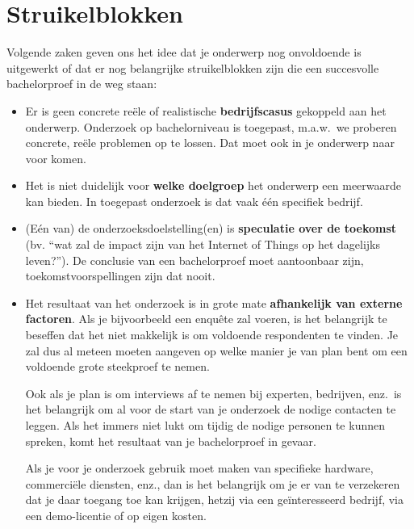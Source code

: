 \section{Struikelblokken}%
\label{sec:onderwerp-struikelblokken}

Volgende zaken geven ons het idee dat je onderwerp nog onvoldoende is uitgewerkt of dat er nog belangrijke struikelblokken zijn die een succesvolle bachelorproef in de weg staan:

\begin{itemize}
  \item Er is geen concrete reële of realistische \textbf{bedrijfscasus} gekoppeld aan het onderwerp. Onderzoek op bachelorniveau is toegepast, m.a.w.~we proberen concrete, reële problemen op te lossen. Dat moet ook in je onderwerp naar voor komen.

  \item Het is niet duidelijk voor \textbf{welke doelgroep} het onderwerp een meerwaarde kan bieden. In toegepast onderzoek is dat vaak één specifiek bedrijf.
  \item (Eén van) de onderzoeksdoelstelling(en) is \textbf{speculatie over de toekomst} (bv. ``wat zal de impact zijn van het Internet of Things op het dagelijks leven?''). De conclusie van een bachelorproef moet aantoonbaar zijn, toekomstvoorspellingen zijn dat nooit.

  \item Het resultaat van het onderzoek is in grote mate \textbf{afhankelijk van externe factoren}. Als je bijvoorbeeld een enquête zal voeren, is het belangrijk te beseffen dat het niet makkelijk is om voldoende respondenten te vinden. Je zal dus al meteen moeten aangeven op welke manier je van plan bent om een voldoende grote steekproef te nemen.
  
  Ook als je plan is om interviews af te nemen bij experten, bedrijven, enz.\ is het belangrijk om al voor de start van je onderzoek de nodige contacten te leggen. Als het immers niet lukt om tijdig de nodige personen te kunnen spreken, komt het resultaat van je bachelorproef in gevaar.

  Als je voor je onderzoek gebruik moet maken van specifieke hardware, commerciële diensten, enz., dan is het belangrijk om je er van te verzekeren dat je daar toegang toe kan krijgen, hetzij via een geïnteresseerd bedrijf, via een demo-licentie of op eigen kosten.


\end{itemize}
